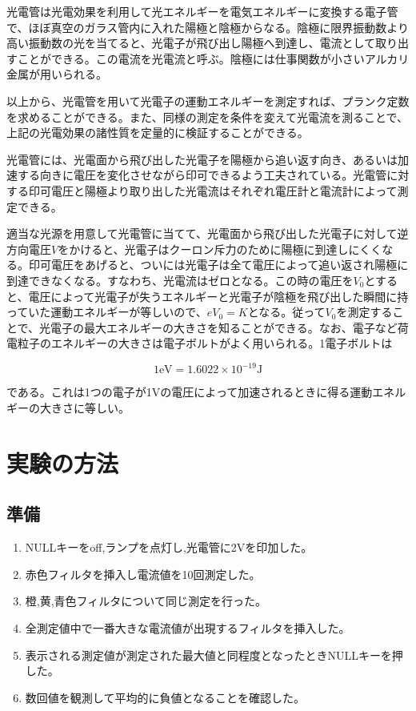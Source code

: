 \documentclass{jsarticle}
\begin{document}
光電管は光電効果を利用して光エネルギーを電気エネルギーに変換する電子管で、ほぼ真空のガラス管内に入れた陽極と陰極からなる。陰極に限界振動数より高い振動数の光を当てると、光電子が飛び出し陽極へ到達し、電流として取り出すことができる。この電流を光電流と呼ぶ。陰極には仕事関数が小さいアルカリ金属が用いられる。\\
\par 以上から、光電管を用いて光電子の運動エネルギーを測定すれば、プランク定数を求めることができる。また、同様の測定を条件を変えて光電流を測ることで、上記の光電効果の諸性質を定量的に検証することができる。\\
\par 光電管には、光電面から飛び出した光電子を陽極から追い返す向き、あるいは加速する向きに電圧を変化させながら印可できるよう工夫されている。光電管に対する印可電圧と陽極より取り出した光電流はそれぞれ電圧計と電流計によって測定できる。\\
\par 適当な光源を用意して光電管に当てて、光電面から飛び出した光電子に対して逆方向電圧$V$をかけると、光電子はクーロン斥力のために陽極に到達しにくくなる。印可電圧をあげると、ついには光電子は全て電圧によって追い返され陽極に到達できなくなる。すなわち、光電流はゼロとなる。この時の電圧を$V_0$とすると、電圧によって光電子が失うエネルギーと光電子が陰極を飛び出した瞬間に持っていた運動エネルギーが等しいので、$eV_0 = K$となる。従って$V_0$を測定することで、光電子の最大エネルギーの大きさを知ることができる。なお、電子など荷電粒子のエネルギーの大きさは電子ボルトがよく用いられる。1電子ボルトは

\begin{equation}
    1\textrm{eV} = 1.6022 \times 10^{-19} \textrm{J}
\end{equation}

である。これは1つの電子が1Vの電圧によって加速されるときに得る運動エネルギーの大きさに等しい。


\section{実験の方法}

\subsection{準備}
\begin{enumerate}
\item NULLキーをoff,ランプを点灯し,光電管に2Vを印加した。
\item 赤色フィルタを挿入し電流値を10回測定した。
\item 橙,黄,青色フィルタについて同じ測定を行った。
\item 全測定値中で一番大きな電流値が出現するフィルタを挿入した。
\item 表示される測定値が測定された最大値と同程度となったときNULLキーを押した。
\item 数回値を観測して平均的に負値となることを確認した。
\end{enumerate}
\end{document}
